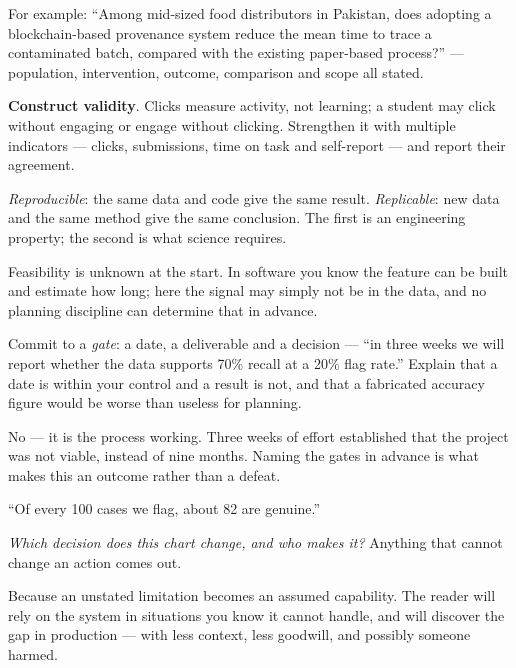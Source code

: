 \begin{ans}
  \item For example: ``Among mid-sized food distributors in Pakistan, does adopting a
        blockchain-based provenance system reduce the mean time to trace a
        contaminated batch, compared with the existing paper-based process?''
        --- population, intervention, outcome, comparison and scope all stated.
  \item \textbf{Construct validity}. Clicks measure activity, not learning; a student
        may click without engaging or engage without clicking. Strengthen it with
        multiple indicators --- clicks, submissions, time on task and self-report ---
        and report their agreement.
  \item \emph{Reproducible}: the same data and code give the same result.
        \emph{Replicable}: new data and the same method give the same conclusion.
        The first is an engineering property; the second is what science requires.
\end{ans}

\begin{ans}
  \item Feasibility is unknown at the start. In software you know the feature can be
        built and estimate how long; here the signal may simply not be in the data,
        and no planning discipline can determine that in advance.
  \item Commit to a \emph{gate}: a date, a deliverable and a decision --- ``in three
        weeks we will report whether the data supports 70\% recall at a 20\% flag
        rate.'' Explain that a date is within your control and a result is not, and
        that a fabricated accuracy figure would be worse than useless for planning.
  \item No --- it is the process working. Three weeks of effort established that the
        project was not viable, instead of nine months. Naming the gates in advance
        is what makes this an outcome rather than a defeat.
\end{ans}

\begin{ans}
  \item ``Of every 100 cases we flag, about 82 are genuine.''
  \item \emph{Which decision does this chart change, and who makes it?} Anything that
        cannot change an action comes out.
  \item Because an unstated limitation becomes an assumed capability. The reader will
        rely on the system in situations you know it cannot handle, and will discover
        the gap in production --- with less context, less goodwill, and possibly
        someone harmed.
\end{ans}

